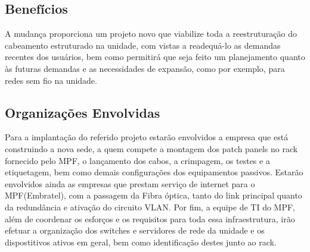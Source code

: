 \documentclass[	DIV=calc,%
							paper=a4,%
							fontsize=12pt,%
							onecolumn]{scrartcl}	 					%
\begin{document}
\subsection{Benefícios}

A mudança proporciona um projeto novo que viabilize toda a reestruturação do cabeamento estruturado na unidade, com vistas a readequá-lo as demandas recentes dos usuários, bem como permitirá que seja feito um planejamento quanto às futuras demandas e as necessidades de expansão, como por exemplo, para redes sem fio na unidade. 


\subsection{Organizações Envolvidas}
Para a implantação do referido projeto estarão envolvidos a empresa que está construindo a nova sede, a quem compete a montagem dos patch panels no rack fornecido pelo MPF, o lançamento dos cabos, a crimpagem, os testes e a etiquetagem, bem como demais configurações dos equipamentos passivos. Estarão envolvidos ainda as empresas que prestam serviço de internet para o MPF(Embratel), com a passagem da Fibra óptica, tanto do link principal quanto da redundância e ativação do circuito VLAN. Por fim, a equipe de TI do MPF, além de coordenar os esforços e os requisitos para toda essa infraestrutura, irão efetuar a organização dos switches e servidores de rede da unidade e os dispostitivos ativos em geral, bem como identificação destes junto ao rack.


\end{document}
